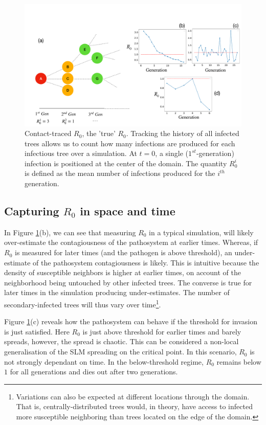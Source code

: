 \begin{figure}
    \centering
    \includegraphics[scale=0.255]{chapter5/figures/fig1.pdf}
    \caption{Contact-traced $R_0$, the 'true' $R_0$. Tracking the history of all infected trees allows us to count how many infections are produced for each infectious tree over a simulation. At $t=0$, a single ($1^{st}$-generation) infection is positioned at the center of the domain. The quantity $R^i_0$ is defined as the mean number of infections produced for  the $i^{th}$ generation.}
    \label{fig:contact-trace}
\end{figure}

\subsection{Capturing $R_0$ in space and time}

In Figure \ref{fig:contact-trace}(b), we can see that measuring $R_0$ in a typical simulation, %
will likely over-estimate the contagiousness of the pathosystem at earlier times. %
Whereas, if $R_0$ is measured for later times (and the pathogen is above threshold), an %
under-estimate of the pathosystem contagiousness is likely. %
This is intuitive because the density of susceptible neighbors is higher at earlier times, %
on account of the neighborhood being untouched by other infected trees. %
The converse is true for later times in the simulation producing under-estimates. %
The number of secondary-infected trees will thus vary over time\footnote{Variations can %
also be expected at different locations through the domain. That is, centrally-distributed %
trees would, in theory, have access to infected more susceptible neighboring than trees %
located on the edge of the domain.}. %

Figure \ref{fig:contact-trace}(c) reveals how the pathosystem can behave if the threshold for %
invasion is just satisfied. %
Here $R_0$ is just above threshold for earlier times and barely spreads, however, the spread is chaotic. %
This can be considered a non-local generalisation of the SLM spreading on the critical point. %
In this scenario, $R_0$ is not strongly dependant on time. %
In the below-threshold regime, $R_0$ remains below $1$ for all generations and dies out after %
two generations. %

